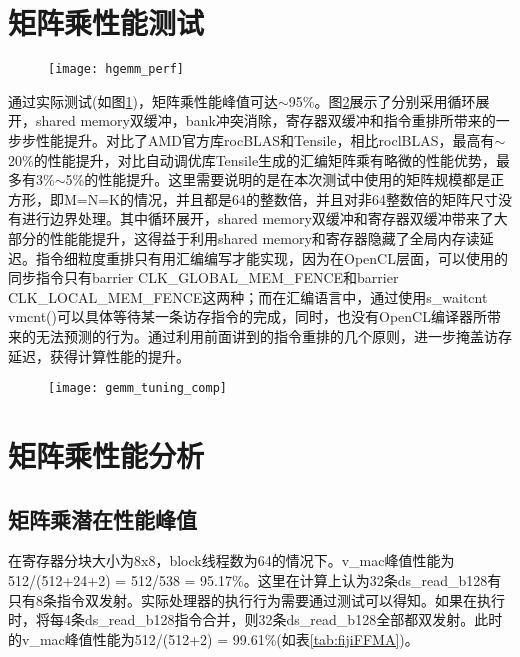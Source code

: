\section{矩阵乘性能测试}
\begin{figure}[htbp]
	\centering
	\texttt{[image: hgemm\_perf]}
	\label{fig:hgemm_perf}
\end{figure}

通过实际测试(如图\ref{fig:hgemm_perf})，矩阵乘性能峰值可达$\sim$95\%。图\ref{fig:gemm_tuning_comp}展示了分别采用循环展开，shared memory双缓冲，bank冲突消除，寄存器双缓冲和指令重排所带来的一步步性能提升。对比了AMD官方库rocBLAS和Tensile，相比roclBLAS，最高有$\sim$20\%的性能提升，对比自动调优库Tensile生成的汇编矩阵乘有略微的性能优势，最多有3\%$\sim$5\%的性能提升。这里需要说明的是在本次测试中使用的矩阵规模都是正方形，即M=N=K的情况，并且都是64的整数倍，并且对非64整数倍的矩阵尺寸没有进行边界处理。其中循环展开，shared memory双缓冲和寄存器双缓冲带来了大部分的性能能提升，这得益于利用shared memory和寄存器隐藏了全局内存读延迟。指令细粒度重排只有用汇编编写才能实现，因为在OpenCL层面，可以使用的同步指令只有barrier CLK\_GLOBAL\_MEM\_FENCE和barrier CLK\_LOCAL\_MEM\_FENCE这两种；而在汇编语言中，通过使用s\_waitcnt vmcnt()可以具体等待某一条访存指令的完成，同时，也没有OpenCL编译器所带来的无法预测的行为。通过利用前面讲到的指令重排的几个原则，进一步掩盖访存延迟，获得计算性能的提升。
\begin{figure}[htbp]
	\centering
	\texttt{[image: gemm\_tuning\_comp]}
	\label{fig:gemm_tuning_comp}
\end{figure}

\section{矩阵乘性能分析}
\subsection{矩阵乘潜在性能峰值}
在寄存器分块大小为8x8，block线程数为64的情况下。v\_mac峰值性能为512/(512+24+2) = 512/538 = 95.17\%。这里在计算上认为32条ds\_read\_b128有只有8条指令双发射。实际处理器的执行行为需要通过测试可以得知。如果在执行时，将每4条ds\_read\_b128指令合并，则32条ds\_read\_b128全部都双发射。此时的v\_mac峰值性能为512/(512+2) = 99.61\%(如表\ref{tab:fijiFFMA})。


